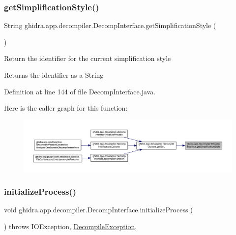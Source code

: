 \subsubsection{\texorpdfstring{getSimplificationStyle()}{getSimplificationStyle()}}
{\footnotesize\ttfamily String ghidra.\+app.\+decompiler.\+Decomp\+Interface.\+get\+Simplification\+Style (\begin{DoxyParamCaption}{ }\end{DoxyParamCaption})\hspace{0.3cm}{\ttfamily [inline]}}

Return the identifier for the current simplification style \begin{DoxyReturn}{Returns}
the identifier as a String 
\end{DoxyReturn}


Definition at line 144 of file Decomp\+Interface.\+java.

Here is the caller graph for this function\+:
\nopagebreak
\begin{figure}[H]
\begin{center}
\leavevmode
\includegraphics[width=350pt]{classghidra_1_1app_1_1decompiler_1_1_decomp_interface_a48e34641720039c672e1ea1ad3284e67_icgraph}
\end{center}
\end{figure}
\mbox{\label{classghidra_1_1app_1_1decompiler_1_1_decomp_interface_a6bd1adef30f49c5f74d95619330c2325}} 
\subsubsection{\texorpdfstring{initializeProcess()}{initializeProcess()}}
{\footnotesize\ttfamily void ghidra.\+app.\+decompiler.\+Decomp\+Interface.\+initialize\+Process (\begin{DoxyParamCaption}{ }\end{DoxyParamCaption}) throws I\+O\+Exception, \mbox{\hyperlink{classghidra_1_1app_1_1decompiler_1_1_decompile_exception}{Decompile\+Exception}}\hspace{0.3cm}{\ttfamily [inline]}, {\ttfamily [protected]}}

